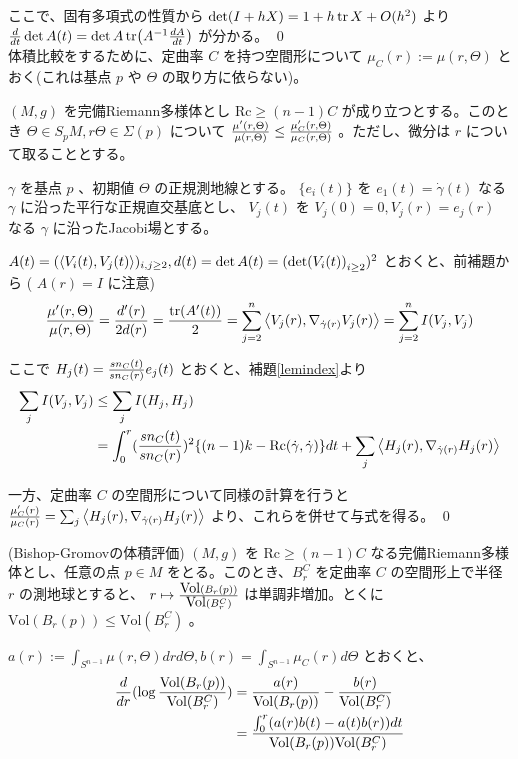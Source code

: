 \documentclass[dvipdfmx,a4paper]{jsreport}
\theoremstyle{definition}
\begin{document}
ここで、固有多項式の性質から $\det(I+hX)=1+h\tr X+O(h^2)$ より ${d \over dt}\det A(t)=\det A\tr(A^{-1}{dA\over dt})$ が分かる。 \qed
\\

体積比較をするために、定曲率 $C$ を持つ空間形について $\mu_C(r):=\mu(r,\Theta)$ とおく(これは基点 $p$ や $\Theta$ の取り方に依らない)。

\lem $(M,g)$ を完備Riemann多様体とし $\mbox{Rc} \geq (n-1)C$ が成り立つとする。このとき $\Theta \in S_pM,r\Theta \in \Sigma(p)$ について ${\mu'(r,\Theta) \over \mu(r,\Theta)} \leq {\mu_C'(r,\Theta) \over \mu_C(r,\Theta)}$ 。ただし、微分は $r$ について取ることとする。

\prf $\gamma$ を基点 $p$ 、初期値 $\Theta$ の正規測地線とする。 $\{e_i(t)\}$ を $e_1(t)=\dot{\gamma}(t)$ なる $\gamma$ に沿った平行な正規直交基底とし、 $V_j(t)$ を $V_j(0)=0,V_j(r)=e_j(r)$ なる $\gamma$ に沿ったJacobi場とする。

$A(t)=(\ev{V_i(t),V_j(t)})_{i,j\geq 2},d(t)=\det A(t)=(\det(V_i(t))_{i \geq 2})^2$ とおくと、前補題から ( $A(r)=I$ に注意)
\begin{align*}
    {\mu'(r,\Theta) \over \mu(r,\Theta)}={d'(r) \over 2d(r)}={\tr(A'(t)) \over 2}=\sum_{j=2}^n \ev{V_j(r),\nabla_{\dot{\gamma}(r)}V_j(r)}=\sum_{j=2}^n I(V_j,V_j)
\end{align*}

ここで $H_j(t)={sn_C(t) \over sn_C(r)}e_j(t)$ とおくと、補題\ref{lemindex}より
\begin{align*}
    \sum_j I(V_j,V_j) &\leq \sum_j I(H_j,H_j) \\
    &= \int_{0}^r ({sn_C(t) \over sn_C(r)})^2\{(n-1)k-\mbox{Rc}(\dot{\gamma},\dot{\gamma})\}dt+\sum_j \ev{H_j(r),\nabla_{\dot{\gamma}(r)}H_j(r)}
\end{align*}

一方、定曲率 $C$ の空間形について同様の計算を行うと ${\mu'_C(r) \over \mu_C(r)}=\sum_j \ev{H_j(r),\nabla_{\dot{\gamma}(r)}H_j(r)}$ より、これらを併せて与式を得る。 \qed

\thm\label{thmbishop} (Bishop-Gromovの体積評価) $(M,g)$ を $\mbox{Rc} \geq (n-1)C$ なる完備Riemann多様体とし、任意の点 $p \in M$ をとる。このとき、$B_r^C$ を定曲率 $C$ の空間形上で半径 $r$ の測地球とすると、 $r \mapsto {\mbox{Vol}(B_r(p)) \over \mbox{Vol}(B_r^C)}$ は単調非増加。とくに $\mbox{Vol}(B_r(p)) \leq \mbox{Vol}(B_r^C)$ 。

\prf $a(r):=\int_{S^{n-1}}\mu(r,\Theta)drd\Theta,b(r)=\int_{S^{n-1}}\mu_C(r)d\Theta$ とおくと、
\begin{align*}
    {d \over dr}(\log {\mbox{Vol}(B_r(p)) \over \mbox{Vol}(B_r^C)}) &= {a(r) \over \mbox{Vol}(B_r(p))}-{b(r) \over \mbox{Vol}(B_r^C)} \\
    &= {\int_0^r (a(r)b(t)-a(t)b(r))dt \over \mbox{Vol}(B_r(p))\mbox{Vol}(B_r^C)}
\end{align*}
\end{document}

